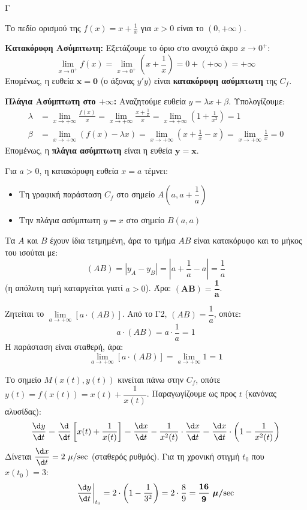 \begin{thema}{Γ}
\begin{erwthma}
\item Το πεδίο ορισμού της $f(x) = x + \frac{1}{x}$ για $x > 0$ είναι το $(0, +\infty)$.

\textbf{Κατακόρυφη Ασύμπτωτη:}
Εξετάζουμε το όριο στο ανοιχτό άκρο $x \to 0^+$:
\[ \lim_{x \to 0^+} f(x) = \lim_{x \to 0^+} \left( x + \frac{1}{x} \right) = 0 + (+\infty) = +\infty \]
Επομένως, η ευθεία $\boldsymbol{x = 0}$ (ο άξονας $y'y$) είναι \textbf{κατακόρυφη ασύμπτωτη} της $C_f$.

\textbf{Πλάγια Ασύμπτωτη στο $+\infty$:}
Αναζητούμε ευθεία $y = \lambda x + \beta$. Υπολογίζουμε:
\begin{align*}
\lambda &= \lim_{x \to +\infty} \frac{f(x)}{x} = \lim_{x \to +\infty} \frac{x + \frac{1}{x}}{x} = \lim_{x \to +\infty} \left( 1 + \frac{1}{x^2} \right) = 1 \\
\beta &= \lim_{x \to +\infty} (f(x) - \lambda x) = \lim_{x \to +\infty} \left( x + \frac{1}{x} - x \right) = \lim_{x \to +\infty} \frac{1}{x} = 0
\end{align*}
Επομένως, η \textbf{πλάγια ασύμπτωτη} είναι η ευθεία $\boldsymbol{y = x}$.

\item Για $a > 0$, η κατακόρυφη ευθεία $x = a$ τέμνει:
\begin{itemize}
    \item Τη γραφική παράσταση $C_f$ στο σημείο $A\left(a, a + \dfrac{1}{a}\right)$
    \item Την πλάγια ασύμπτωτη $y = x$ στο σημείο $B(a, a)$
\end{itemize}
Τα $A$ και $B$ έχουν ίδια τετμημένη, άρα το τμήμα $AB$ είναι κατακόρυφο και το μήκος του ισούται με:
\[ (AB) = |y_A - y_B| = \left| a + \frac{1}{a} - a \right| = \frac{1}{a} \]
(η απόλυτη τιμή καταργείται γιατί $a > 0$). Άρα: $\boldsymbol{(AB) = \dfrac{1}{a}}$.

\item Ζητείται το $\lim\limits_{a \to +\infty} [a \cdot (AB)]$.
Από το Γ2, $(AB) = \dfrac{1}{a}$, οπότε:
\[ a \cdot (AB) = a \cdot \frac{1}{a} = 1 \]
Η παράσταση είναι σταθερή, άρα:
\[ \lim_{a \to +\infty} [a \cdot (AB)] = \lim_{a \to +\infty} 1 = \boldsymbol{1} \]

\item Το σημείο $M(x(t), y(t))$ κινείται πάνω στην $C_f$, οπότε $y(t) = f(x(t)) = x(t) + \dfrac{1}{x(t)}$.
Παραγωγίζουμε ως προς $t$ (κανόνας αλυσίδας):
\[ \frac{\d y}{\d t} = \frac{\d}{\d t}\left[ x(t) + \frac{1}{x(t)} \right] = \frac{\d x}{\d t} - \frac{1}{x^2(t)} \cdot \frac{\d x}{\d t} = \frac{\d x}{\d t} \cdot \left( 1 - \frac{1}{x^2(t)} \right) \]
Δίνεται $\dfrac{\d x}{\d t} = 2 \ \mu/\si{sec}$ (σταθερός ρυθμός).
Για τη χρονική στιγμή $t_0$ που $x(t_0) = 3$:
\[ \frac{\d y}{\d t}\bigg|_{t_0} = 2 \cdot \left( 1 - \frac{1}{3^2} \right) = 2 \cdot \frac{8}{9} = \boldsymbol{\frac{16}{9} \ \mu/\si{sec}} \]
\end{erwthma}
\end{thema}

